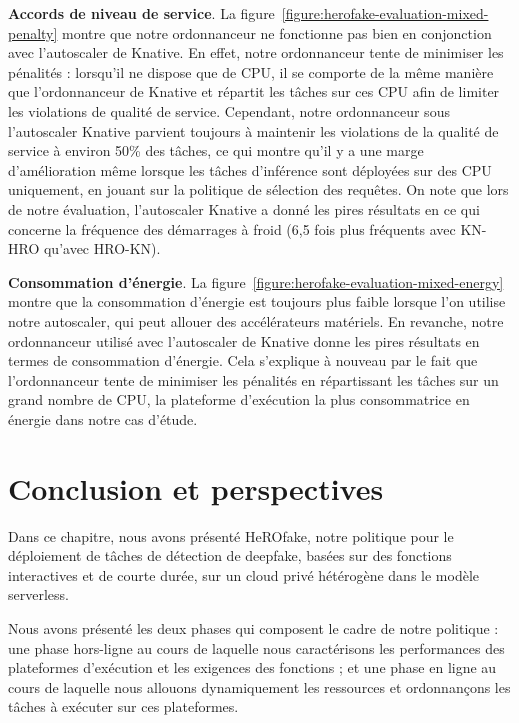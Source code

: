\textbf{Accords de niveau de service}. La figure~\ref{figure:herofake-evaluation-mixed-penalty} montre que notre ordonnanceur ne fonctionne pas bien en conjonction avec l'autoscaler de Knative. En effet, notre ordonnanceur tente de minimiser les pénalités : lorsqu'il ne dispose que de CPU, il se comporte de la même manière que l'ordonnanceur de Knative et répartit les tâches sur ces CPU afin de limiter les violations de qualité de service. Cependant, notre ordonnanceur sous l'autoscaler Knative parvient toujours à maintenir les violations de la qualité de service à environ 50\% des tâches, ce qui montre qu'il y a une marge d'amélioration même lorsque les tâches d'inférence sont déployées sur des CPU uniquement, en jouant sur la politique de sélection des requêtes. On note que lors de notre évaluation, l'autoscaler Knative a donné les pires résultats en ce qui concerne la fréquence des démarrages à froid (6,5 fois plus fréquents avec KN-HRO qu'avec HRO-KN).

\textbf{Consommation d'énergie}. La figure~\ref{figure:herofake-evaluation-mixed-energy} montre que la consommation d'énergie est toujours plus faible lorsque l'on utilise notre autoscaler, qui peut allouer des accélérateurs matériels. En revanche, notre ordonnanceur utilisé avec l'autoscaler de Knative donne les pires résultats en termes de consommation d'énergie. Cela s'explique à nouveau par le fait que l'ordonnanceur tente de minimiser les pénalités en répartissant les tâches sur un grand nombre de CPU, la plateforme d'exécution la plus consommatrice en énergie dans notre cas d'étude.

\section{Conclusion et perspectives}
\label{section:herofake-conclusion}

Dans ce chapitre, nous avons présenté HeROfake, notre politique pour le déploiement de tâches de détection de deepfake, basées sur des fonctions interactives et de courte durée, sur un cloud privé hétérogène dans le modèle serverless.

Nous avons présenté les deux phases qui composent le cadre de notre politique : une phase hors-ligne au cours de laquelle nous caractérisons les performances des plateformes d'exécution et les exigences des fonctions ; et une phase en ligne au cours de laquelle nous allouons dynamiquement les ressources et ordonnançons les tâches à exécuter sur ces plateformes.


